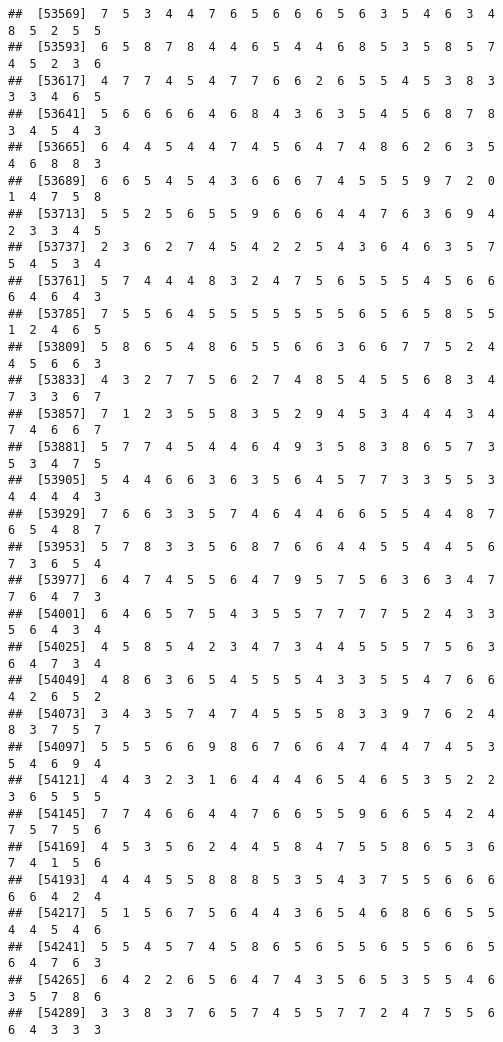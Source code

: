 \documentclass[
]{book}
\begin{document}
\begin{verbatim}
##  [53569]  7  5  3  4  4  7  6  5  6  6  6  5  6  3  5  4  6  3  4  8  5  2  5  5
##  [53593]  6  5  8  7  8  4  4  6  5  4  4  6  8  5  3  5  8  5  7  4  5  2  3  6
##  [53617]  4  7  7  4  5  4  7  7  6  6  2  6  5  5  4  5  3  8  3  3  3  4  6  5
##  [53641]  5  6  6  6  6  4  6  8  4  3  6  3  5  4  5  6  8  7  8  3  4  5  4  3
##  [53665]  6  4  4  5  4  4  7  4  5  6  4  7  4  8  6  2  6  3  5  4  6  8  8  3
##  [53689]  6  6  5  4  5  4  3  6  6  6  7  4  5  5  5  9  7  2  0  1  4  7  5  8
##  [53713]  5  5  2  5  6  5  5  9  6  6  6  4  4  7  6  3  6  9  4  2  3  3  4  5
##  [53737]  2  3  6  2  7  4  5  4  2  2  5  4  3  6  4  6  3  5  7  5  4  5  3  4
##  [53761]  5  7  4  4  4  8  3  2  4  7  5  6  5  5  5  4  5  6  6  6  4  6  4  3
##  [53785]  7  5  5  6  4  5  5  5  5  5  5  5  6  5  6  5  8  5  5  1  2  4  6  5
##  [53809]  5  8  6  5  4  8  6  5  5  6  6  3  6  6  7  7  5  2  4  4  5  6  6  3
##  [53833]  4  3  2  7  7  5  6  2  7  4  8  5  4  5  5  6  8  3  4  7  3  3  6  7
##  [53857]  7  1  2  3  5  5  8  3  5  2  9  4  5  3  4  4  4  3  4  7  4  6  6  7
##  [53881]  5  7  7  4  5  4  4  6  4  9  3  5  8  3  8  6  5  7  3  5  3  4  7  5
##  [53905]  5  4  4  6  6  3  6  3  5  6  4  5  7  7  3  3  5  5  3  4  4  4  4  3
##  [53929]  7  6  6  3  3  5  7  4  6  4  4  6  6  5  5  4  4  8  7  6  5  4  8  7
##  [53953]  5  7  8  3  3  5  6  8  7  6  6  4  4  5  5  4  4  5  6  7  3  6  5  4
##  [53977]  6  4  7  4  5  5  6  4  7  9  5  7  5  6  3  6  3  4  7  7  6  4  7  3
##  [54001]  6  4  6  5  7  5  4  3  5  5  7  7  7  7  5  2  4  3  3  5  6  4  3  4
##  [54025]  4  5  8  5  4  2  3  4  7  3  4  4  5  5  5  7  5  6  3  6  4  7  3  4
##  [54049]  4  8  6  3  6  5  4  5  5  5  4  3  3  5  5  4  7  6  6  4  2  6  5  2
##  [54073]  3  4  3  5  7  4  7  4  5  5  5  8  3  3  9  7  6  2  4  8  3  7  5  7
##  [54097]  5  5  5  6  6  9  8  6  7  6  6  4  7  4  4  7  4  5  3  5  4  6  9  4
##  [54121]  4  4  3  2  3  1  6  4  4  4  6  5  4  6  5  3  5  2  2  3  6  5  5  5
##  [54145]  7  7  4  6  6  4  4  7  6  6  5  5  9  6  6  5  4  2  4  7  5  7  5  6
##  [54169]  4  5  3  5  6  2  4  4  5  8  4  7  5  5  8  6  5  3  6  7  4  1  5  6
##  [54193]  4  4  4  5  5  8  8  8  5  3  5  4  3  7  5  5  6  6  6  6  6  4  2  4
##  [54217]  5  1  5  6  7  5  6  4  4  3  6  5  4  6  8  6  6  5  5  4  4  5  4  6
##  [54241]  5  5  4  5  7  4  5  8  6  5  6  5  5  6  5  5  6  6  5  6  4  7  6  3
##  [54265]  6  4  2  2  6  5  6  4  7  4  3  5  6  5  3  5  5  4  6  3  5  7  8  6
##  [54289]  3  3  8  3  7  6  5  7  4  5  5  7  7  2  4  7  5  5  6  6  4  3  3  3

\end{verbatim}
\end{document}

